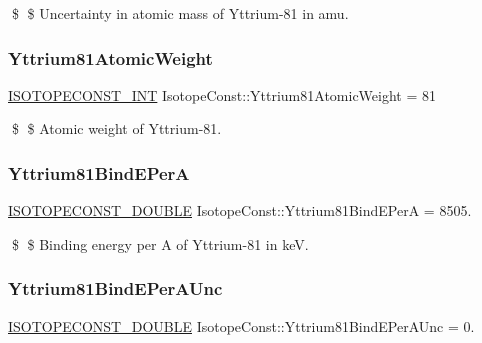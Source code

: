 \$ \$ Uncertainty in atomic mass of Yttrium-\/81 in amu. \mbox{\label{group___isotope_const-_yttrium-_y81_gad26850497309ba3ec1d5e2fddafa6327}} 
\subsubsection{\texorpdfstring{Yttrium81\+Atomic\+Weight}{Yttrium81AtomicWeight}}
{\footnotesize\ttfamily \mbox{\hyperlink{group___isotope_const-_macros_ga5f18360b3e99483a35c32d789e62621c}{I\+S\+O\+T\+O\+P\+E\+C\+O\+N\+S\+T\+\_\+\+I\+NT}} Isotope\+Const\+::\+Yttrium81\+Atomic\+Weight = 81}

\$ \$ Atomic weight of Yttrium-\/81. \mbox{\label{group___isotope_const-_yttrium-_y81_ga3a05eb166e362c18b9ad5e90a67af8c7}} 
\subsubsection{\texorpdfstring{Yttrium81\+Bind\+E\+PerA}{Yttrium81BindEPerA}}
{\footnotesize\ttfamily \mbox{\hyperlink{group___isotope_const-_macros_ga8f45a7272ce02c0b4c65c44636ed719a}{I\+S\+O\+T\+O\+P\+E\+C\+O\+N\+S\+T\+\_\+\+D\+O\+U\+B\+LE}} Isotope\+Const\+::\+Yttrium81\+Bind\+E\+PerA = 8505.}

\$ \$ Binding energy per A of Yttrium-\/81 in keV. \mbox{\label{group___isotope_const-_yttrium-_y81_ga32a0926ac71764a1a3bd128ff3143d80}} 
\subsubsection{\texorpdfstring{Yttrium81\+Bind\+E\+Per\+A\+Unc}{Yttrium81BindEPerAUnc}}
{\footnotesize\ttfamily \mbox{\hyperlink{group___isotope_const-_macros_ga8f45a7272ce02c0b4c65c44636ed719a}{I\+S\+O\+T\+O\+P\+E\+C\+O\+N\+S\+T\+\_\+\+D\+O\+U\+B\+LE}} Isotope\+Const\+::\+Yttrium81\+Bind\+E\+Per\+A\+Unc = 0.}

